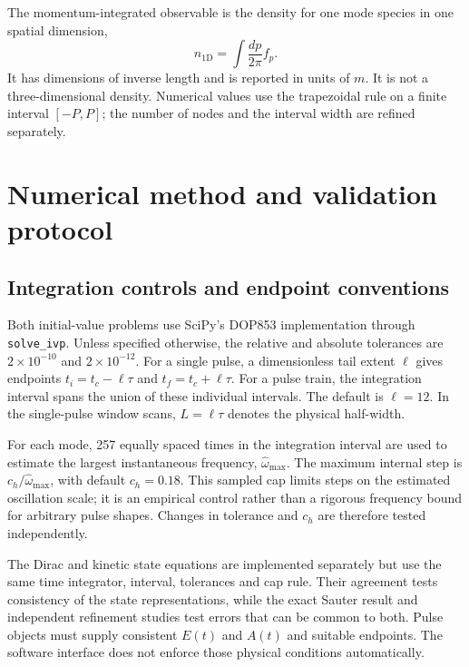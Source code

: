 \documentclass[anonymous]{iopjournal}
\begin{document}
The momentum-integrated observable is the density for one mode species in one spatial dimension,
\begin{equation}
  n_{1\mathrm D}=\int\frac{dp}{2\pi}f_p.
  \label{eq:density}
\end{equation}
It has dimensions of inverse length and is reported in units of $m$. It is not a three-dimensional density. Numerical values use the trapezoidal rule on a finite interval $[-P,P]$; the number of nodes and the interval width are refined separately.

\section{Numerical method and validation protocol}
\label{sec:software}

\subsection{Integration controls and endpoint conventions}

Both initial-value problems use SciPy's DOP853 implementation through \texttt{solve\_ivp}. Unless specified otherwise, the relative and absolute tolerances are $2\times10^{-10}$ and $2\times10^{-12}$. For a single pulse, a dimensionless tail extent $\ell$ gives endpoints $t_i=t_c-\ell\tau$ and $t_f=t_c+\ell\tau$. For a pulse train, the integration interval spans the union of these individual intervals. The default is $\ell=12$. In the single-pulse window scans, $L=\ell\tau$ denotes the physical half-width.

For each mode, 257 equally spaced times in the integration interval are used to estimate the largest instantaneous frequency, $\widehat\omega_{\max}$. The maximum internal step is $c_h/\widehat\omega_{\max}$, with default $c_h=0.18$. This sampled cap limits steps on the estimated oscillation scale; it is an empirical control rather than a rigorous frequency bound for arbitrary pulse shapes. Changes in tolerance and $c_h$ are therefore tested independently.

The Dirac and kinetic state equations are implemented separately but use the same time integrator, interval, tolerances and cap rule. Their agreement tests consistency of the state representations, while the exact Sauter result and independent refinement studies test errors that can be common to both. Pulse objects must supply consistent $E(t)$ and $A(t)$ and suitable endpoints. The software interface does not enforce those physical conditions automatically.
\end{document}
